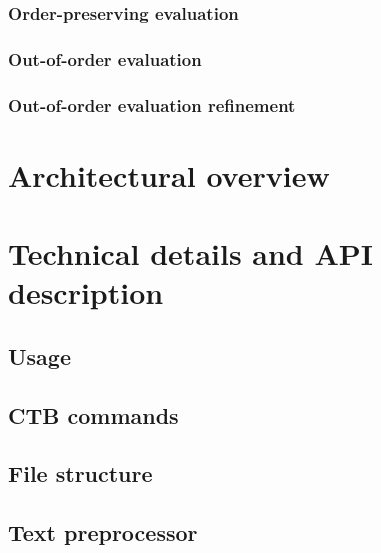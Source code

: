         \subsection{Order-preserving evaluation} 

        \subsection{Out-of-order evaluation} 

        \subsection{Out-of-order evaluation refinement} 

\chapter{Architectural overview}

    \label{ch:implementation}

   

    

    


\chapter{Technical details and API description}
    \label{ch:faq}

    \section{Usage} 

    \section{CTB commands} 

    \section{File structure} 

    \section{Text preprocessor} 


